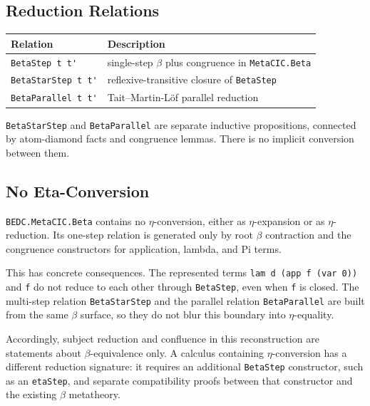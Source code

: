 \subsection{Reduction Relations}\label{subsec:reconstruction-reduction-table}

\begin{center}
\begin{tabular}{l l}
\hline
Relation & Description \\
\hline
\verb|BetaStep t t'| & single-step $\beta$ plus congruence in \texttt{MetaCIC.Beta} \\
\verb|BetaStarStep t t'| & reflexive-transitive closure of \texttt{BetaStep} \\
\verb|BetaParallel t t'| & Tait--Martin-L\"of parallel reduction \\
\hline
\end{tabular}
\end{center}

\verb|BetaStarStep| and \verb|BetaParallel| are separate inductive
propositions, connected by atom-diamond facts and congruence lemmas. There is
no implicit conversion between them.

\subsection{No Eta-Conversion}\label{subsec:reconstruction-no-eta-conversion}

\texttt{BEDC.MetaCIC.Beta} contains no $\eta$-conversion, either as
$\eta$-expansion or as $\eta$-reduction. Its one-step relation is generated
only by root $\beta$ contraction and the congruence constructors for
application, lambda, and Pi terms.

This has concrete consequences. The represented terms
\verb|lam d (app f (var 0))| and \verb|f| do not reduce to each other through
\texttt{BetaStep}, even when \verb|f| is closed. The multi-step relation
\texttt{BetaStarStep} and the parallel relation \texttt{BetaParallel} are
built from the same $\beta$ surface, so they do not blur this boundary into
$\eta$-equality.

Accordingly, subject reduction and confluence in this reconstruction are
statements about $\beta$-equivalence only. A calculus containing
$\eta$-conversion has a different reduction signature: it requires an
additional \texttt{BetaStep} constructor, such as an \texttt{etaStep}, and
separate compatibility proofs between that constructor and the existing
$\beta$ metatheory.
